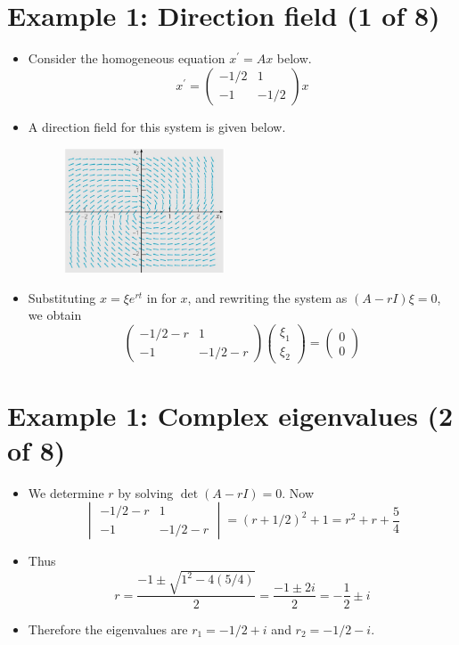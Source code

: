 \documentclass[11pt,a4paper]{article}
\begin{document}
	\section*{Example 1: Direction field (1 of 8)}
	\begin{itemize}
		\item Consider the homogeneous equation $x^\prime = Ax$ below.
		$$
		x^\prime =
		\begin{pmatrix}
			-1/2 & 1\\
			-1 & -1/2
		\end{pmatrix}x
		$$
		\item A direction field for this system is given below.
		\begin{figure}[H]
			\centering
				\includegraphics[width=0.45\textwidth]{figure/Lec13f1.PNG}
		\end{figure}
		\item Substituting $x = \xi e^{rt}$ in for $x$, and rewriting the system as $(A-rI)\xi=0$, we obtain
		$$
		\begin{pmatrix}
			-1/2-r & 1\\
			-1 & -1/2 - r
		\end{pmatrix}
		\begin{pmatrix}
			\xi_1\\
			\xi_2
		\end{pmatrix}=
		\begin{pmatrix}
			0\\
			0
		\end{pmatrix}
		$$
	\end{itemize}
	\section*{Example 1: Complex eigenvalues (2 of 8)}
	\begin{itemize}
		\item We determine $r$ by solving $\det(A-rI) = 0$. Now
		$$
		\begin{vmatrix}
			-1/2-r & 1\\
			-1 & -1/2-r
		\end{vmatrix}
		= (r+1/2)^2+1
		= r^2 + r + \frac{5}{4}
		$$
		\item Thus
		$$
		r = \frac{-1\pm \sqrt{1^2-4(5/4)}}{2}
		= \frac{-1\pm2i}{2} = -\frac{1}{2}\pm i
		$$
		\item Therefore the eigenvalues are $r_1 = -1/2 + i$ and $r_2 = -1/2 - i$.
	\end{itemize}
\end{document}
